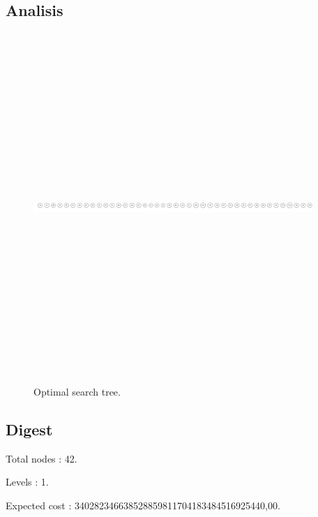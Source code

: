 \documentclass{article}
\begin{document}
\subsection{Analisis}
\begin{figure}[H]\centering
\noindent\includegraphics[height=500px, width=400px, keepaspectratio]{reports/tree.pdf}
\caption{Optimal search tree.}
\end{figure}
\newpage

\subsection{Digest}
\begin{compactitem}
\item Total nodes : {\Large 42}.
\item Levels : {\Large 1}.
\item Expected cost : {\Large 340282346638528859811704183484516925440,00}.
\end{compactitem}
\end{document}
